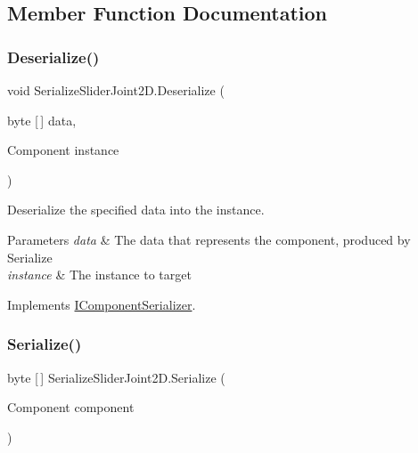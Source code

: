 \subsection{Member Function Documentation}
\mbox{\label{class_serialize_slider_joint2_d_a50d76e3724e23d0acc752f75715be6e8}} 
\subsubsection{\texorpdfstring{Deserialize()}{Deserialize()}}
{\footnotesize\ttfamily void Serialize\+Slider\+Joint2\+D.\+Deserialize (\begin{DoxyParamCaption}\item[{byte \mbox{[}$\,$\mbox{]}}]{data,  }\item[{Component}]{instance }\end{DoxyParamCaption})\hspace{0.3cm}{\ttfamily [inline]}}



Deserialize the specified data into the instance. 


\begin{DoxyParams}{Parameters}
{\em data} & The data that represents the component, produced by Serialize \\
\hline
{\em instance} & The instance to target \\
\hline
\end{DoxyParams}


Implements \hyperlink{interface_i_component_serializer_a4cc366a5c78b33d47a90c209d8fed883}{I\+Component\+Serializer}.

\mbox{\label{class_serialize_slider_joint2_d_ad690d87ffc29815b59900bde784a1ed3}} 
\subsubsection{\texorpdfstring{Serialize()}{Serialize()}}
{\footnotesize\ttfamily byte \mbox{[}$\,$\mbox{]} Serialize\+Slider\+Joint2\+D.\+Serialize (\begin{DoxyParamCaption}\item[{Component}]{component }\end{DoxyParamCaption})\hspace{0.3cm}{\ttfamily [inline]}}



